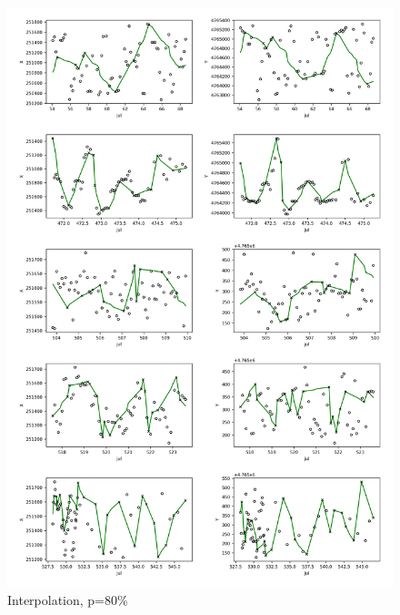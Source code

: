\documentclass[11pt]{article}
\begin{document}
\begin{figure}[h]
  \centering
  \includegraphics[width=\textwidth]{../figure/80_5094_interpolation} %
  \caption{Interpolation, p=80\%}
  \label{fig: interpolation_80} %
\end{figure}
\end{document}
